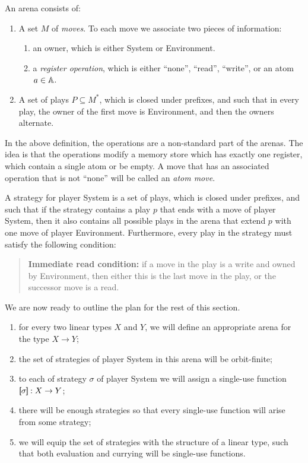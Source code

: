 \begin{definition}[Arena] 
    An arena consists of:
    \begin{enumerate}
        \item A set $M$ of \emph{moves}. To each move we associate two pieces of information: 
\begin{enumerate}
    \item an owner,  which is either System or Environment. 
    \item a \emph{register operation}, which is either ``none'', ``read'', ``write'', or an atom $a \in \mathbb A$.
\end{enumerate}
        
        \item A set of plays $P \subseteq M^*$, which is closed under prefixes, and such that in every play, the owner of the first move is Environment, and then the owners alternate.
    \end{enumerate}
\end{definition}
In the above definition, the operations are a non-standard part of the arenas.  The idea is that the operations modify a memory store which has exactly one register, which contain a single atom or be empty.  A move that has an associated operation that is not ``none'' will be called an \emph{atom move}.




\begin{definition}[Strategy]
    A strategy for player System is a set of plays, which is closed under prefixes, and such that if the strategy contains a play $p$ that ends with a move of player System, then it also contains all possible plays in the arena that extend $p$ with one move of player Environment. Furthermore, every play in the strategy must satisfy the following condition: \begin{quote} {\bf Immediate read condition:}
        if a move in the play is a write and owned by Environment, then either this is the last move in the play, or the successor move is a read.
    \end{quote}
\end{definition}

We are now ready to outline the plan for the rest of this section. 
\begin{enumerate}
    \item for every two linear types $X$ and $Y$, we will define an appropriate arena for the type $X \to Y$;
    \item the set of strategies of player System in this arena will be orbit-finite;
    \item to each of strategy $\sigma$ of player System we will assign a single-use function $[\!\![\sigma]\!\!] : X \to Y$;
    \item there will be enough strategies so that  every single-use function will arise from some strategy;
    \item we will equip the set of strategies with the structure of a linear type, such that both evaluation and currying will be single-use functions.
\end{enumerate}



